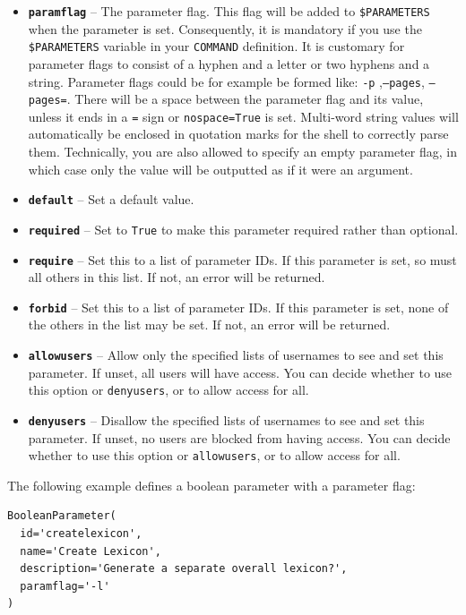 \documentclass[a4paper,12pt]{report}
\begin{document}
\begin{itemize}
\item \textbf{\texttt{paramflag}} -- The parameter flag. This flag will be added to \texttt{\$PARAMETERS} when the parameter is set. Consequently, it is mandatory if you use the \texttt{\$PARAMETERS} variable in your \texttt{COMMAND} definition. It is customary for parameter flags to consist of a hyphen and a letter or two hyphens and a string. Parameter flags could be for example be formed like: \texttt{-p} ,\texttt{--pages}, \texttt{--pages=}. There will be a space between the parameter flag and its value, unless it ends in a \texttt{=} sign or \texttt{nospace=True} is set. Multi-word string values will automatically be enclosed in quotation marks for the shell to correctly parse them. Technically, you are also allowed to specify an empty parameter flag, in which case only the value will be outputted as if it were an argument.
\item \textbf{\texttt{default}} -- Set a default value.
\item \textbf{\texttt{required}} -- Set to \texttt{True} to make this parameter required rather than optional.
\item \textbf{\texttt{require}} -- Set this to a list of parameter IDs. If this parameter is set, so must all others in this list. If not, an error will be returned.
\item \textbf{\texttt{forbid}} -- Set this to a list of parameter IDs. If this parameter is set, none of the others in the list may be set.  If not, an error will be returned.
\item \textbf{\texttt{allowusers}} -- Allow only the specified lists of usernames to see and set this parameter. If unset, all users will have access. You can decide whether to use this option or \texttt{denyusers}, or to allow access for all.
\item \textbf{\texttt{denyusers}} -- Disallow the specified lists of usernames to see and set this parameter. If unset, no users are blocked from having access. You can decide whether to use this option or \texttt{allowusers}, or to allow access for all.
\end{itemize}

The following example defines a boolean parameter with a parameter flag:

{\footnotesize{
\begin{verbatim}
BooleanParameter(
  id='createlexicon',
  name='Create Lexicon',
  description='Generate a separate overall lexicon?',
  paramflag='-l'
)
\end{verbatim}
}}
\end{document}
